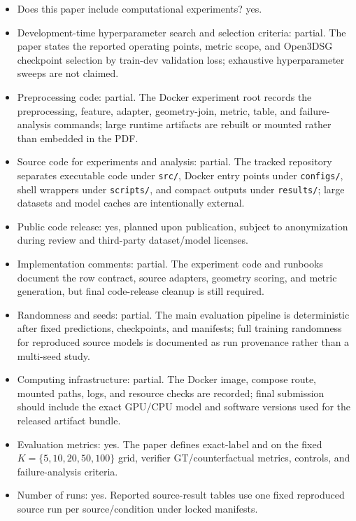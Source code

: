 \begin{itemize}
    \item Does this paper include computational experiments? yes.
    \item Development-time hyperparameter search and selection criteria:
    partial. The paper states the reported operating points, metric scope, and
    Open3DSG checkpoint selection by train-dev validation loss; exhaustive
    hyperparameter sweeps are not claimed.
    \item Preprocessing code: partial. The Docker experiment root records the
    preprocessing, feature, adapter, geometry-join, metric, table, and
    failure-analysis commands; large runtime artifacts are rebuilt or mounted
    rather than embedded in the PDF.
    \item Source code for experiments and analysis: partial. The tracked
    repository separates executable code under \texttt{src/}, Docker entry
    points under \texttt{configs/}, shell wrappers under \texttt{scripts/}, and
    compact outputs under \texttt{results/}; large datasets and model caches
    are intentionally external.
    \item Public code release: yes, planned upon publication, subject to
    anonymization during review and third-party dataset/model licenses.
    \item Implementation comments: partial. The experiment code and runbooks
    document the row contract, source adapters, geometry scoring, and metric
    generation, but final code-release cleanup is still required.
    \item Randomness and seeds: partial. The main evaluation pipeline is
    deterministic after fixed predictions, checkpoints, and manifests; full
    training randomness for reproduced source models is documented as run
    provenance rather than a multi-seed study.
    \item Computing infrastructure: partial. The Docker image, compose route,
    mounted paths, logs, and resource checks are recorded; final submission
    should include the exact GPU/CPU model and software versions used for the
    released artifact bundle.
    \item Evaluation metrics: yes. The paper defines exact-label
     and  on the fixed $K=\{5,10,20,50,100\}$ grid, verifier
    GT/counterfactual metrics, controls, and failure-analysis criteria.
    \item Number of runs: yes. Reported source-result tables use one fixed
    reproduced source run per source/condition under locked manifests.

\end{itemize}

